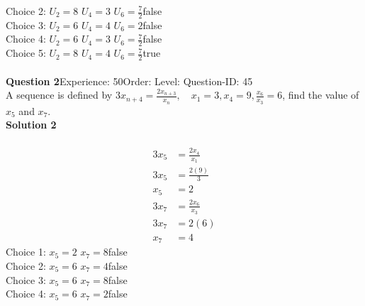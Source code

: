 \documentclass{article}
\begin{document}
Choice 2: \hspace{20pt}$U_2=8 \,\, U_4=3 \,\, U_6=\displaystyle\frac{7}{2} $\hspace{20pt}false\\
Choice 3: \hspace{20pt}$U_2=6 \,\, U_4=4 \,\, U_6=2 $\hspace{20pt}false\\
Choice 4: \hspace{20pt}$U_2=6 \,\, U_4=3 \,\, U_6=\displaystyle\frac{7}{2} $\hspace{20pt}false\\
Choice 5: \hspace{20pt}$U_2=8 \,\, U_4=4 \,\, U_6=\displaystyle\frac{7}{2} $\hspace{20pt}true\\
\\[4pt]
\noindent\textbf{Question 2}\hspace{20pt}Experience: 50\hspace{20pt}Order: \hspace{20pt}Level: \hspace{20pt}Question-ID: 45\\[2pt]
A sequence is defined by $3x_{n+4}=\displaystyle\frac{2x_{n+3}}{x_n}, \quad x_1=3,x_4=9, \displaystyle\frac{x_6}{x_3}=6$, find the value of $x_5$ and $x_7$.\\[4pt]
\noindent\textbf{Solution 2}\\[2pt]
\\[-35pt]\begin{align*}
3x_5&=\displaystyle\frac{2x_{4}}{x_1}\\[2pt]
3x_5&=\displaystyle\frac{2(9)}{3}\\[2pt]
x_5&=2\\[12pt]
3x_7&=\displaystyle\frac{2x_6}{x_3}\\[2pt]
3x_7&=2(6)\\[2pt]
x_7&=4
\end{align*}
Choice 1: \hspace{20pt}$x_5=2 \,\, x_7=8$\hspace{20pt}false\\
Choice 2: \hspace{20pt}$x_5=6 \,\, x_7=4$\hspace{20pt}false\\
Choice 3: \hspace{20pt}$x_5=6 \,\, x_7=8$\hspace{20pt}false\\
Choice 4: \hspace{20pt}$x_5=6 \,\, x_7=2$\hspace{20pt}false\\
\end{document}
